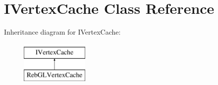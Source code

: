 \hypertarget{class_i_vertex_cache}{}\section{I\+Vertex\+Cache Class Reference}
\label{class_i_vertex_cache}
Inheritance diagram for I\+Vertex\+Cache\+:\begin{figure}[H]
\begin{center}
\leavevmode
\includegraphics[height=2.000000cm]{class_i_vertex_cache}
\end{center}
\end{figure}
